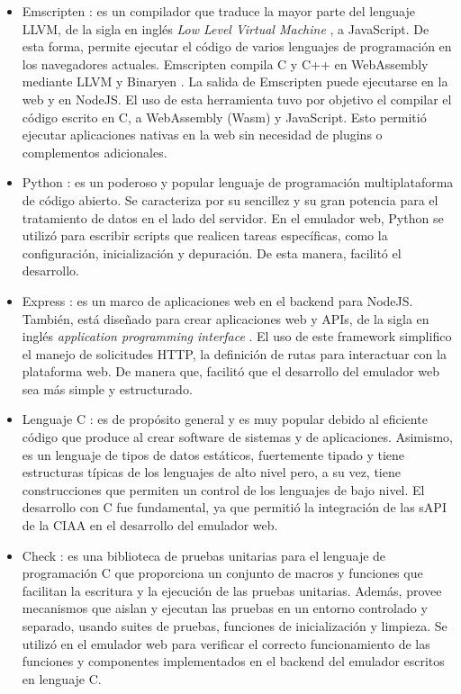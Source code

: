 \begin{itemize}
	\item Emscripten \citep{Emscripten}: es un compilador que traduce la mayor parte del lenguaje LLVM, de la sigla en inglés \textit{Low Level Virtual Machine} \citep{LLVM}, a JavaScript. De esta forma, permite ejecutar el código de varios lenguajes de programación en los navegadores actuales.
Emscripten compila C y C++ en WebAssembly \citep{WebAssembly} mediante LLVM y Binaryen \citep{Binaryen}. La salida de Emscripten puede ejecutarse en la web y en NodeJS.
El uso de esta herramienta tuvo por objetivo el compilar el código escrito en C, a WebAssembly (Wasm) y JavaScript.	Esto permitió ejecutar aplicaciones nativas en la web sin necesidad de plugins o complementos adicionales.

	\item Python \citep{Python}:  es un poderoso y popular lenguaje de programación multiplataforma de código abierto. Se caracteriza por su sencillez y su gran potencia para el tratamiento de datos en el lado del servidor. En el emulador web, Python se utilizó para escribir scripts que realicen tareas específicas, como la configuración, inicialización y depuración. De esta manera, facilitó el desarrollo.
    
    \item Express \citep{Express}: es un marco de aplicaciones web en el backend para NodeJS. También, está diseñado para crear aplicaciones web y APIs, de la sigla en inglés \textit{application programming interface} \citep{API}. El uso de este framework simplifico el manejo de solicitudes HTTP, la definición de rutas para interactuar con la plataforma web. De manera que, facilitó que el desarrollo del emulador web sea más simple y estructurado.
    
    \item Lenguaje C \citep{LenguajeC}: es de propósito general y es muy popular debido al eficiente código que produce al crear software de sistemas y de aplicaciones. 
    Asimismo, es un lenguaje de tipos de datos estáticos, fuertemente tipado y tiene estructuras típicas de los lenguajes de alto nivel pero, a su vez, tiene construcciones que permiten un control de los lenguajes de bajo nivel. El desarrollo con C fue fundamental, ya que permitió la integración de las sAPI de la CIAA en el desarrollo del emulador web.

    
    \item Check \citep{Check}: es una biblioteca de pruebas unitarias para el lenguaje de programación C que proporciona un conjunto de macros y funciones que facilitan la escritura y la ejecución de las pruebas unitarias. Además, provee mecanismos que aislan y ejecutan las pruebas en un entorno controlado y separado, usando suites de pruebas, funciones de inicialización y limpieza. Se utilizó en el emulador web para verificar el correcto funcionamiento de las funciones y componentes implementados en el backend del emulador escritos en lenguaje C.
    

\end{itemize}
